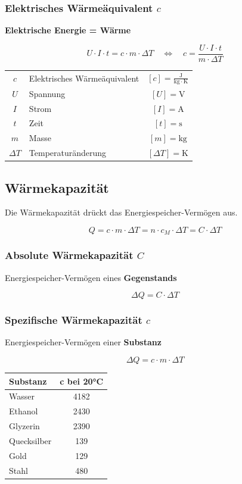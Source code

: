 \subsubsection{Elektrisches Wärmeäquivalent $c$}
\textbf{Elektrische Energie = Wärme}

$$ U \cdot I \cdot t = c \cdot m \cdot \Delta T \quad \Leftrightarrow \quad c = \frac{U \cdot I \cdot t}{m \cdot \Delta T}$$

\begin{tabular}{c l c}
	\rule{0pt}{8pt}$c$ & Elektrisches Wärmeäquivalent & $[c] = \mathrm{\frac{J}{kg \cdot K}}$ \\
	$U$ & Spannung & $[U] = \mathrm{V}$ \\
	$I$ & Strom & $[I] = \mathrm{A}$ \\
	$t$ & Zeit & $[t] = \mathrm{s}$ \\
	$m$ & Masse & $[m] = \mathrm{kg}$ \\
	$\Delta T$ & Temperaturänderung & $[\Delta T] = \mathrm{K}$ \\
\end{tabular}



\subsection{Wärmekapazität}
Die Wärmekapazität drückt das Energiespeicher-Vermögen aus.

$$ \boxed{ Q = c \cdot m \cdot \Delta T = n \cdot c_M \cdot \Delta T = C \cdot \Delta T  }$$


\subsubsection{Absolute Wärmekapazität $C$}
Energiespeicher-Vermögen eines \textbf{Gegenstands}

$$ \boxed{ \Delta Q = C \cdot \Delta T } $$


\subsubsection{Spezifische Wärmekapazität $c$}
Energiespeicher-Vermögen einer \textbf{Substanz}

\begin{minipage}{0.4\linewidth}
	$$ \boxed{ \Delta Q = c \cdot m \cdot \Delta T  } $$	
\end{minipage}
\hfill
\begin{minipage}{0.5\linewidth}
	\begin{center}
		\begin{tabular}{lc}
			\textbf{Substanz} & \textbf{c bei 20°C}\\ \hline
			Wasser      & 4182 \\
			Ethanol     & 2430 \\
			Glyzerin    & 2390 \\
			Quecksilber & 139 \\
			Gold        & 129 \\
			Stahl       & 480 \\
		\end{tabular}
	\end{center}
\end{minipage}

